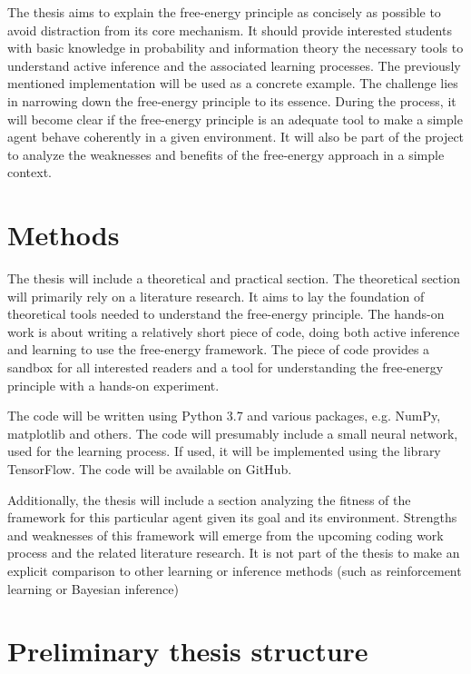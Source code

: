 \documentclass[11pt,
  paper=a4,
  bibliography=totocnumbered,
	captions=tableheading,
	BCOR=10mm
]{scrreprt}
\theoremstyle{definition}
\begin{document}
The thesis aims to explain the free-energy principle as concisely as possible to avoid distraction from its core mechanism. It should provide interested students with basic knowledge in probability and information theory the necessary tools to understand active inference and the associated learning processes. The previously mentioned implementation will be used as a concrete example. The challenge lies in narrowing down the free-energy principle to its essence. During the process, it will become clear if the free-energy principle is an adequate tool to make a simple agent behave coherently in a given environment. It will also be part of the project to analyze the weaknesses and benefits of the free-energy approach in a simple context.

\section{Methods}

The thesis will include a theoretical and practical section. The theoretical section will primarily rely on a literature research. It aims to lay the foundation of theoretical tools needed to understand the free-energy principle. The hands-on work is about writing a relatively short piece of code, doing both active inference and learning to use the free-energy framework. The piece of code provides a sandbox for all interested readers and a tool for understanding the free-energy principle with a hands-on experiment.

The code will be written using Python 3.7 and various packages, e.g. NumPy, matplotlib and others. The code will presumably include a small neural network, used for the learning process. If used, it will be implemented using the library TensorFlow. The code will be available on GitHub.

Additionally, the thesis will include a section analyzing the fitness of the framework for this particular agent given its goal and its environment. Strengths and weaknesses of this framework will emerge from the upcoming coding work process and the related literature research. It is not part of the thesis to make an explicit comparison to other learning or inference methods (such as reinforcement learning or Bayesian inference)

\section{Preliminary thesis structure}
\end{document}
